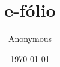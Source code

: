 \documentclass[12pt,a4paper]{article}
\author{Anonymous}
\title{e-fólio}
\date{\today}
\begin{document}


\newpage



\nocite{uabefoliotemplate}
\printbibliography
\end{document}
